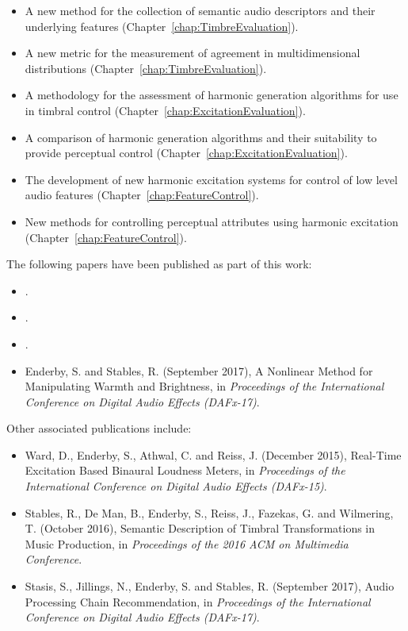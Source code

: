 	\begin{itemize}
		\item A new method for the collection of semantic audio descriptors and their underlying features
		      (Chapter~\ref{chap:TimbreEvaluation}).
		\item A new metric for the measurement of agreement in multidimensional distributions
		      (Chapter~\ref{chap:TimbreEvaluation}).
		\item A methodology for the assessment of harmonic generation algorithms for use in timbral control
		      (Chapter~\ref{chap:ExcitationEvaluation}).
		\item A comparison of harmonic generation algorithms and their suitability to provide perceptual control
		      (Chapter~\ref{chap:ExcitationEvaluation}).
		\item The development of new harmonic excitation systems for control of low level audio features
		      (Chapter~\ref{chap:FeatureControl}).
		\item New methods for controlling perceptual attributes using harmonic excitation
		      (Chapter~\ref{chap:FeatureControl}).
	\end{itemize}

	The following papers have been published as part of this work:

	\begin{itemize}
		\item {}.
		\item {}.
		\item {}.
		\item Enderby, S. and Stables, R. (September 2017), A Nonlinear Method for Manipulating Warmth and
		      Brightness, in \emph{Proceedings of the International Conference on Digital Audio Effects (DAFx-17)}.
	\end{itemize}

	Other associated publications include:

	\begin{itemize}
		\item Ward, D., Enderby, S., Athwal, C. and Reiss, J. (December 2015), Real-Time Excitation Based Binaural
		      Loudness Meters, in \emph{Proceedings of the International Conference on Digital Audio Effects
		      (DAFx-15)}.
		\item Stables, R., De Man, B., Enderby, S., Reiss, J., Fazekas, G. and Wilmering, T. (October 2016),
		      Semantic Description of Timbral Transformations in Music Production, in \emph{Proceedings of the
		      2016 ACM on Multimedia Conference}.
		\item Stasis, S., Jillings, N., Enderby, S. and Stables, R. (September 2017), Audio Processing Chain
		      Recommendation, in \emph{Proceedings of the International Conference on Digital Audio Effects
		      (DAFx-17)}.
	\end{itemize}
